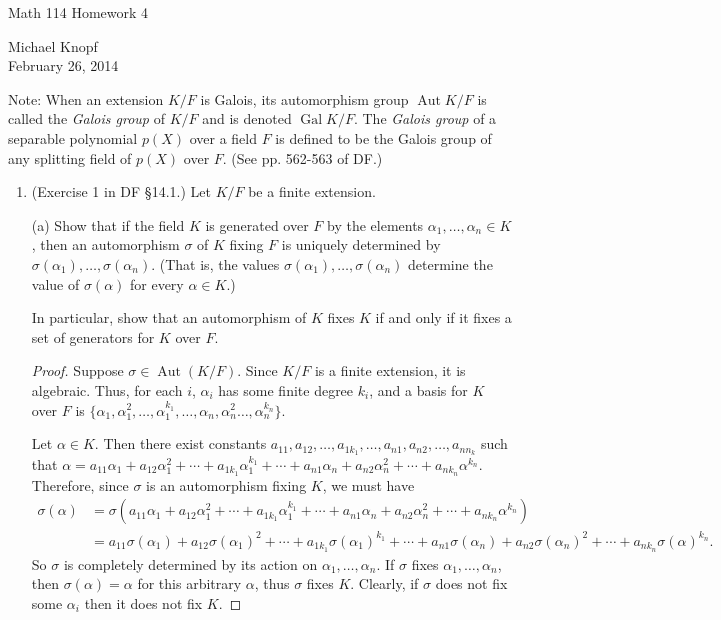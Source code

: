 \documentclass[10pt]{article}
\DeclareMathOperator*{\Aut}{Aut}
\DeclareMathOperator*{\Gal}{Gal}
\begin{document}
\begin{center}
\large Math 114 Homework 4

\normalsize Michael Knopf \\ February 26, 2014
\end{center}

Note: When an extension $K/F$ is Galois, its automorphism group $\Aut K/F$ is called the \emph{Galois group} of $K/F$ and is denoted $\Gal K/F$.  The \emph{Galois group} of a separable polynomial $p(X)$ over a field $F$ is defined to be the Galois group of any splitting field of $p(X)$ over $F$.  (See pp. 562-563 of DF.)

\begin{enumerate}

\item (Exercise 1 in DF \S 14.1.) Let $K/F$ be a finite extension.

(a) Show that if the field $K$ is generated over $F$ by the elements $\alpha_1,\ldots,\alpha_n \in K$, then an automorphism $\sigma$ of $K$ fixing $F$ is uniquely determined by $\sigma(\alpha_1),\ldots,\sigma(\alpha_n)$.  (That is, the values $\sigma(\alpha_1),\ldots,\sigma(\alpha_n)$ determine the value of $\sigma(\alpha)$ for every $\alpha \in K$.)

In particular, show that an automorphism of $K$ fixes $K$ if and only if it fixes a set of generators for $K$ over $F$.

\begin{proof}

Suppose $\sigma \in \Aut(K/F)$.  Since $K/F$ is a finite extension, it is algebraic.  Thus, for each $i$, $\alpha_i$ has some finite degree $k_i$, and a basis for $K$ over $F$ is $\{\alpha_1, \alpha_1^2, \dots, \alpha_1^{k_1}, \dots, \alpha_n, \alpha_n^2 \dots, \alpha_n^{k_n} \}$.

Let $\alpha \in K$.  Then there exist constants $a_{11}, a_{12}, \dots , a_{1k_1}, \dots , a_{n1}, a_{n2}, \dots , a_{n n_k}$ such that $\alpha = a_{11}\alpha_1 + a_{12}\alpha_1^2 + \cdots + a_{1k_1}\alpha_1^{k_1} + \cdots + a_{n1}\alpha_n + a_{n2}\alpha_n^2 + \cdots + a_{nk_n}\alpha^{k_n}$.  Therefore, since $\sigma$ is an automorphism fixing $K$, we must have
\begin{align*}
\sigma(\alpha) &= \sigma(a_{11}\alpha_1 + a_{12}\alpha_1^2 + \cdots + a_{1k_1}\alpha_1^{k_1} + \cdots + a_{n1}\alpha_n + a_{n2}\alpha_n^2 + \cdots + a_{nk_n}\alpha^{k_n})
\\
&= a_{11}\sigma(\alpha_1) + a_{12}\sigma(\alpha_1)^2 + \cdots + a_{1k_1}\sigma(\alpha_1)^{k_1} + \cdots + a_{n1}\sigma(\alpha_n) + a_{n2}\sigma(\alpha_n)^2 + \cdots + a_{nk_n}\sigma(\alpha)^{k_n}.
\end{align*}
So $\sigma$ is completely determined by its action on $\alpha_1, \dots , \alpha_n$.  If $\sigma$ fixes $\alpha_1, \dots , \alpha_n$, then $\sigma(\alpha) = \alpha$ for this arbitrary $\alpha$, thus $\sigma$ fixes $K$.  Clearly, if $\sigma$ does not fix some $\alpha_i$ then it does not fix $K$.


\end{proof}
\end{enumerate}
\end{document}
